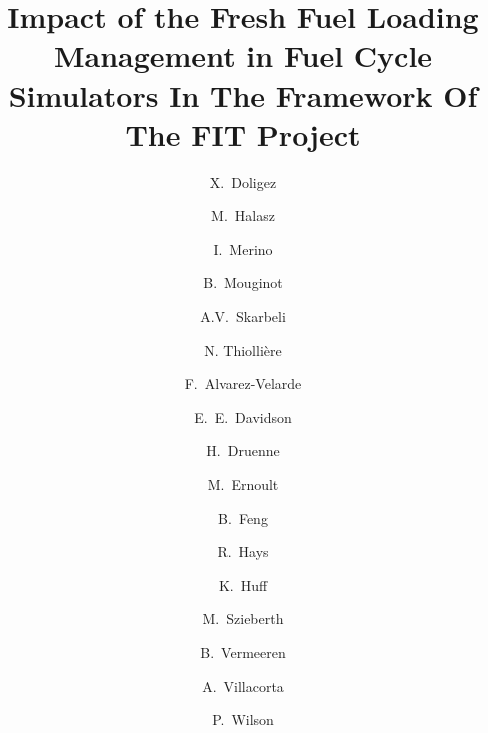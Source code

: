 \documentclass[review]{elsarticle}
\begin{document}
\begin{frontmatter}

\title{Impact of the Fresh Fuel Loading Management in Fuel Cycle Simulators In The Framework Of The FIT Project}



\author[IPNO]{X.~Doligez}
\author[BUD]{M.~Halasz}
\author[MAULE]{I.~Merino}
\author[MAD]{B.~Mouginot}
\author[CIEMAT]{A.V.~Skarbeli}

\author[SUB]{N. Thiolli\`ere }

\author[CIEMAT]{F.~Alvarez-Velarde}
\author[ORNL]{E.~E.~Davidson}
\author[TRACT]{H.~Druenne}
\author[IPNO]{M.~Ernoult}
\author[ANL]{B.~Feng}
\author[INL]{R.~Hays}
\author[UI]{K.~Huff}
\author[BUD]{M.~Szieberth}
\author[TRACT]{B.~Vermeeren}
\author[CIEMAT]{A.~Villacorta}
\author[MAD]{P.~Wilson}


\address[IPNO]{Institut de Physique Nucléaire d’Orsay, CNRS-IN2P3/Univ, Paris-Sud, France}
\address[BUD]{Budapest University of Technology and Economics (BME), Institute of Nuclear Techniques, 1111 Budapest, Müegyetem rkp. 3-9, Hungary}
\address[MAULE]{Catholic University of the Maule, Av. San Miguel 3605, Talca, Chile}
\address[MAD]{Univ. of Wisconsin Madison, Department of Nuclear Engineering and Engineering Physics, Madison, WI, United States}
\address[CIEMAT]{CIEMAT, Avda. Complutense, 40, 28040 Madrid, Spain}
\address[SUB]{Subatech, IMTA-IN2P3/CNRS-Universit\'e, Nantes, F-44307, France}

\address[ORNL]{Oak Ridge National Laboratory, Building 5700, Mail Stop 6172, Oak Ridge, TN 37831, United States}
\address[TRACT]{Tractebel Engie, Boulevard Simón Bolívar 34-36, 1000 Brussels, Belgium}
\address[ANL]{Argonne National Laboratory, 9700 Cass Ave., Lemont, IL 60439, USA}
\address[INL]{Idaho National Laboratory, 2525 Fremont Ave., Idaho Falls, ID 83402, USA}
\address[UI]{University of Illinois, Department of Nuclear, Plasma, and Radiological Engineering, United States}


\end{frontmatter}
\end{document}

